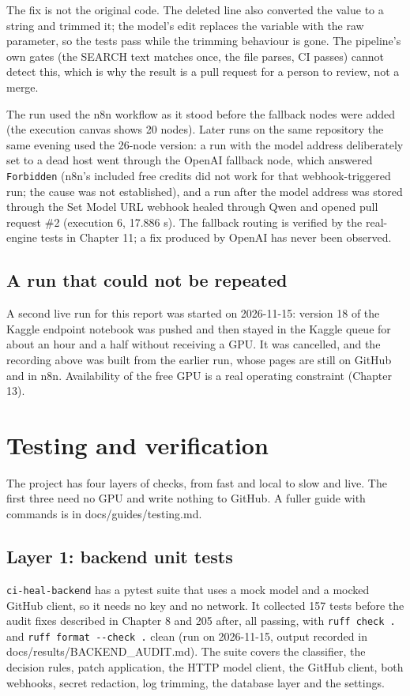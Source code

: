 \documentclass[11pt,a4paper]{report}
\begin{document}
The fix is not the original code. The deleted line also converted the value to a string and trimmed it; the model's edit replaces the variable with the raw parameter, so the tests pass while the trimming behaviour is gone. The pipeline's own gates (the SEARCH text matches once, the file parses, CI passes) cannot detect this, which is why the result is a pull request for a person to review, not a merge.

The run used the n8n workflow as it stood before the fallback nodes were added (the execution canvas shows 20 nodes). Later runs on the same repository the same evening used the 26-node version: a run with the model address deliberately set to a dead host went through the OpenAI fallback node, which answered \texttt{Forbidden} (n8n's included free credits did not work for that webhook-triggered run; the cause was not established), and a run after the model address was stored through the Set Model URL webhook healed through Qwen and opened pull request \#2 (execution 6, 17.886 s). The fallback routing is verified by the real-engine tests in Chapter 11; a fix produced by OpenAI has never been observed.

\section{A run that could not be repeated}

A second live run for this report was started on 2026-11-15: version 18 of the Kaggle endpoint notebook was pushed and then stayed in the Kaggle queue for about an hour and a half without receiving a GPU. It was cancelled, and the recording above was built from the earlier run, whose pages are still on GitHub and in n8n. Availability of the free GPU is a real operating constraint (Chapter 13).

\chapter{Testing and verification}

The project has four layers of checks, from fast and local to slow and live. The first three need no GPU and write nothing to GitHub. A fuller guide with commands is in docs/guides/testing.md.

\section{Layer 1: backend unit tests}

\texttt{ci-\allowbreak{}heal-\allowbreak{}backend} has a pytest suite that uses a mock model and a mocked GitHub client, so it needs no key and no network. It collected 157 tests before the audit fixes described in Chapter 8 and 205 after, all passing, with \texttt{ruff check .\allowbreak{}} and \texttt{ruff format -\allowbreak{}-\allowbreak{}check .\allowbreak{}} clean (run on 2026-11-15, output recorded in docs/results/BACKEND\_AUDIT.md). The suite covers the classifier, the decision rules, patch application, the HTTP model client, the GitHub client, both webhooks, secret redaction, log trimming, the database layer and the settings.
\end{document}
